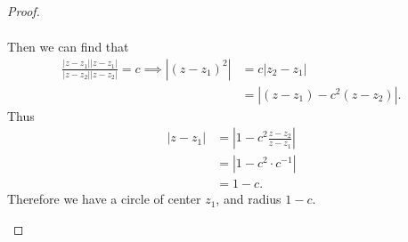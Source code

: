 \documentclass[12pt]{article}
\begin{document}
\begin{proof}
\begin{itemize}
\begin{align*}
      \end{align*}
      Then we can find that 
      \begin{align*}
        \frac{|z-z_1||z-z_1|}{|z-z_2||z-z_2|} = c \implies |(z-z_1)^2| &= c|z_2-z_1| \\
                                                                       &= |(z-z_1)-c^2(z-z_2)|. 
      \end{align*}
      Thus 
      \begin{align*}
        |z-z_1| &= |1 - c^2 \frac{z-z_2}{z-z_1}| \\
                &= |1 - c^2 \cdot c^{-1}|  \\ 
                &= 1-c.
      \end{align*}
      Therefore we have a circle of center $z_1$, and radius $1-c$.
  \end{itemize}
\end{proof}
\end{document}

